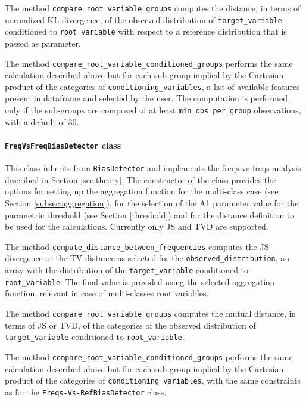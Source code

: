 \documentclass[
]{ceurart}
\begin{document}
The method \texttt{compare\_root\_variable\_groups} computes the distance, in terms of normalized KL divergence, of the observed distribution of \texttt{target\_variable} conditioned to \texttt{root\_variable} with respect to a reference distribution that is passed as parameter.

The method \texttt{compare\_root\_variable\_conditioned\_groups} performs the same calculation described above but for each sub-group implied by the Cartesian product of the categories of \texttt{conditioning\_variables}, a list of available features present in dataframe and selected by the user. The computation is performed only if the sub-groups are composed of at least \texttt{min\_obs\_per\_group} observations, with a default of 30. 

\paragraph{\texttt{FreqVsFreqBiasDetector} class}
This class inherits from \texttt{BiasDetector} and implements the freqs-vs-freqs analysis described in Section \ref{sec:theory}. The constructor of the class provides the options for setting up the aggregation function for the multi-class case (see Section \ref{subsec:aggregation}), for the selection of the A1 parameter value for the parametric threshold (see Section \ref{threshold}) and for the distance definition to be used for the calculations. Currently only JS and TVD are supported. 

The method \texttt{compute\_distance\_between\_frequencies} computes the JS divergence or the TV distance as selected for the \texttt{observed\_distribution}, an array with the distribution of the \texttt{target\_variable} conditioned to \texttt{root\_variable}. The final value is provided using the selected aggregation function, relevant in case of multi-classes root variables. 

The method \texttt{compare\_root\_variable\_groups} computes the mutual distance, in terms of JS or TVD, of the categories of the observed distribution of \texttt{target\_variable} conditioned to \texttt{root\_variable}.

The method \texttt{compare\_root\_variable\_conditioned\_groups} performs the same calculation described above but for each sub-group implied by the Cartesian product of the categories of \texttt{conditioning\_variables}, with the same constraints as for the \texttt{Freqs-Vs-RefBiasDetector} class.

\end{document}

